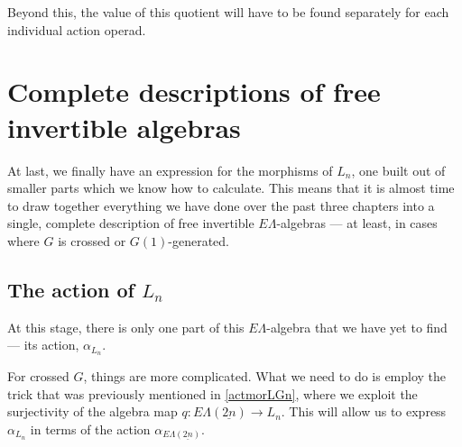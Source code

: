 \documentclass{amsbook} %
\newcommand{\ELnn}{E\Lambda(\underline{2n})}
\numberwithin{section}{chapter}
\begin{document}
Beyond this, the value of this quotient will have to be found separately for each individual action operad. 

\chapter{Complete descriptions of free invertible algebras}
\label{mainthm}

At last, we finally have an expression for the morphisms of $L_n$, one built out of smaller parts which we know how to calculate. This means that it is almost time to draw together everything we have done over the past three chapters into a single, complete description of free invertible $E\Lambda$-algebras --- at least, in cases where $G$ is crossed or $G(1)$-generated. 

\section{The action of \texorpdfstring{$L_n$}{L_n}}

At this stage, there is only one part of this $E\Lambda$-algebra that we have yet to find --- its action, $\alpha_{L_n}$. 
%

For crossed $G$, things are more complicated. What we need to do is employ the trick that was previously mentioned in \cref{actmorLGn}, where we exploit the surjectivity of the algebra map $q: \ELnn \to L_n$. This will allow us to express $\alpha_{L_n}$ in terms of the action $\alpha_{\ELnn}$. 
\end{document}
